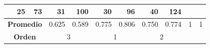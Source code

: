 \begin{table}[h]
{\begin{tabular}{|c|c|c|c|c|c|c|c|c|c|c|}
			\hline
			\rowcolor[rgb]{ .851,  .851,  .851} \multicolumn{3}{|c|}{\textbf{Suma}} & \multicolumn{1}{r|}{25} & \multicolumn{1}{r|}{73} & \multicolumn{1}{r|}{31} & \multicolumn{1}{r|}{100} & \multicolumn{1}{r|}{30} & \multicolumn{1}{r|}{96} & \multicolumn{1}{r|}{40} & \multicolumn{1}{r|}{124} \bigstrut\\
			\hline
			\multicolumn{3}{|c|}{\textbf{Promedio}} & \multicolumn{1}{r|}{0.625} & \multicolumn{1}{r|}{\cellcolor[rgb]{ 1,  1,  0}0.589} & \multicolumn{1}{r|}{0.775} & \multicolumn{1}{r|}{\cellcolor[rgb]{ 1,  1,  0}0.806} & \multicolumn{1}{r|}{0.750} & \multicolumn{1}{r|}{\cellcolor[rgb]{ 1,  1,  0}0.774} & \multicolumn{1}{r|}{1} & \multicolumn{1}{r|}{\cellcolor[rgb]{ 1,  1,  0}1} \bigstrut\\
			\hline
			\multicolumn{3}{|c|}{\textbf{Orden}} & \multicolumn{2}{c|}{3} & \multicolumn{2}{c|}{1} & \multicolumn{2}{c|}{2} & \multicolumn{2}{c|}{} \bigstrut\\
			\hline
		\end{tabular}%
		\label{tab:eval_tecnica}%
	}
\end{table}%


